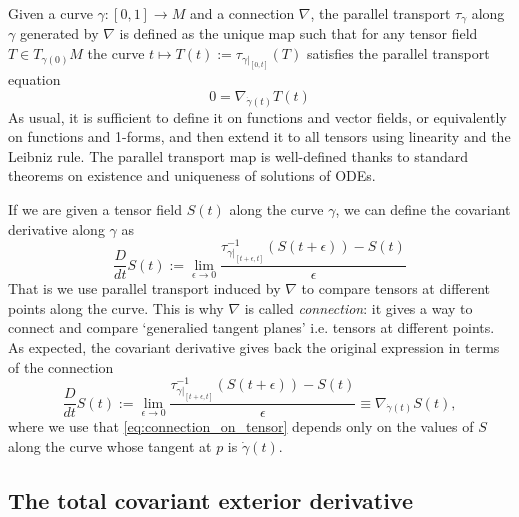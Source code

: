 \documentclass[../geometry_main.tex]{subfiles}
\begin{document}
\begin{mytheorem}
Given a curve $\gamma: [0,1] \to M$ and a connection $\nabla$, the parallel transport $\tau_{\gamma}$ along $\gamma$ generated by $\nabla$ is defined as the unique map such that for any tensor field $T\in T_{\gamma(0)} M$ the curve $t \mapsto T(t) := \tau_{\gamma|_{[0,t]}} (T)$ satisfies the parallel transport equation
\begin{equation}
    0 = \nabla_{\dot{\gamma}(t)} T(t) 
\end{equation}
As usual, it is sufficient to define it on functions and vector fields, or equivalently on functions and 1-forms, and then extend it to all tensors using linearity and the Leibniz rule.
The parallel transport map is well-defined thanks to standard theorems on existence and uniqueness of solutions of ODEs.

If we are given a tensor field $S(t)$ along the curve $\gamma$, we can define the covariant derivative along $\gamma$ as
\begin{equation}
    \frac{D}{dt}S(t) := \lim_{\epsilon \to 0} \frac{\tau_{\gamma|_{[t+\epsilon,t]}}^{-1} (S(t+\epsilon)) - S(t)}{\epsilon} 
\end{equation}
That is we use parallel transport induced by $\nabla$ to compare tensors at different points along the curve.
This is why $\nabla$ is called \emph{connection}: it gives a way to connect and compare `generalied tangent planes' i.e. tensors at different points.
As expected, the covariant derivative gives back the original expression in terms of the connection
\begin{equation}
    \frac{D}{dt}S(t) := \lim_{\epsilon \to 0} \frac{\tau_{\gamma|_{[t+\epsilon,t]}}^{-1} (S(t+\epsilon)) - S(t)}{\epsilon}
    \equiv \nabla_{\dot{\gamma}(t)} S(t),
\end{equation}
where we use that \eqref{eq:connection_on_tensor} depends only on the values of $S$ along the curve whose tangent at $p$ is $\dot{\gamma}(t)$.
\end{mytheorem}



\subsection{The total covariant exterior derivative}
\end{document}
